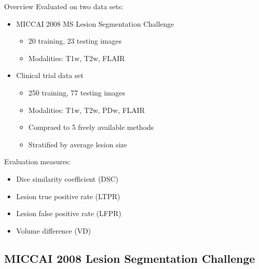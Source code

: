 \documentclass{beamer}
\begin{document}
\begin{frame}{Overview}
Evaluated on two data sets:
\begin{itemize}
\item MICCAI 2008 MS Lesion Segmentation Challenge
\begin{itemize}
\item 20 training, 23 testing images
\item Modalities: T1w, T2w, FLAIR 
\end{itemize}
\item Clinical trial data set
\begin{itemize}
\item 250 training, 77 testing images
\item Modalities: T1w, T2w, PDw, FLAIR
\item Compraed to 5 freely available methods
\item Stratified by average lesion size
\end{itemize}
\end{itemize}
\vspace{1em}
Evaluation measures:
\begin{itemize}
\item Dice similarity coefficient (DSC)
\item Lesion true positive rate (LTPR)
\item Lesion false positive rate (LFPR)
\item Volume difference (VD)
\end{itemize}
\end{frame}

\subsection{MICCAI 2008 Lesion Segmentation Challenge}
\end{document}
